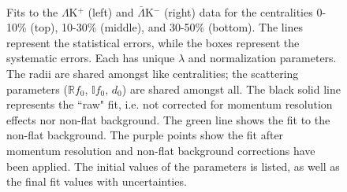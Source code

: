 \documentclass[../AnalysisNoteJBuxton.tex]{subfiles}
\begin{document}
\begin{figure}[h!]
  \centering
  \\  
  \caption[$\Lambda$K$^{+}$($\bar{\Lambda}$K$^{-}$) Fits, with NO residual correlations included, with No Residuals]{Fits to the $\Lambda$K$^{+}$ (left) and $\bar{\Lambda}$K$^{-}$ (right) data for the centralities 0-10\% (top), 10-30\% (middle), and 30-50\% (bottom).
The lines represent the statistical errors, while the boxes represent the systematic errors.  
Each has unique $\lambda$ and normalization parameters.
The radii are shared amongst like centralities; the scattering parameters ($\mathbb{R}f_{0}$, $\mathbb{I}f_{0}$, $d_{0}$) are shared amongst all.
The black solid line represents the ``raw" fit, i.e. not corrected for momentum resolution effects nor non-flat background.  
The green line shows the fit to the non-flat background.
The purple points show the fit after momentum resolution and non-flat background corrections have been applied.
The initial values of the parameters is listed, as well as the final fit values with uncertainties.}
  \label{fig:LamKchPwConjFits_NoRes}
\end{figure}
\end{document}
